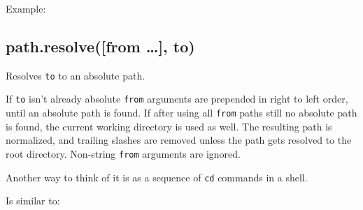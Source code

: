 Example:

\begin{Shaded}
\begin{Highlighting}[]
\NormalTok{(}\NormalTok{, }\NormalTok{, }\NormalTok{, }\NormalTok{, }\NormalTok{)}

\NormalTok{(}\NormalTok{, \{\}, }\NormalTok{)}
   
\end{Highlighting}
\end{Shaded}

\subsection{path.resolve({[}from \ldots{}{]},
to)}\label{path.resolvefrom-to}

Resolves \texttt{to} to an absolute path.

If \texttt{to} isn't already absolute \texttt{from} arguments are
prepended in right to left order, until an absolute path is found. If
after using all \texttt{from} paths still no absolute path is found, the
current working directory is used as well. The resulting path is
normalized, and trailing slashes are removed unless the path gets
resolved to the root directory. Non-string \texttt{from} arguments are
ignored.

Another way to think of it is as a sequence of \texttt{cd} commands in a
shell.

\begin{Shaded}
\begin{Highlighting}[]
\NormalTok{(}\NormalTok{, }\NormalTok{, }\NormalTok{, }\NormalTok{)}
\end{Highlighting}
\end{Shaded}

Is similar to:

\begin{Shaded}
\begin{Highlighting}[]
 
\end{Highlighting}
\end{Shaded}

